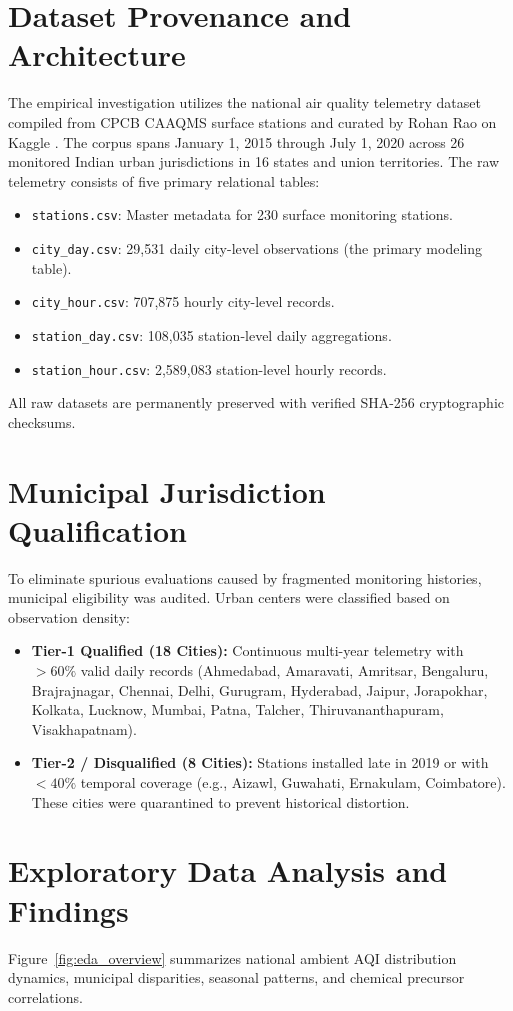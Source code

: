 \documentclass[11pt,a4paper]{report}
\begin{document}
\section{Dataset Provenance and Architecture}
The empirical investigation utilizes the national air quality telemetry dataset compiled from CPCB CAAQMS surface stations and curated by Rohan Rao on Kaggle \cite{rao2020airquality}. The corpus spans January 1, 2015 through July 1, 2020 across 26 monitored Indian urban jurisdictions in 16 states and union territories. The raw telemetry consists of five primary relational tables:
\begin{itemize}
    \item \texttt{stations.csv}: Master metadata for 230 surface monitoring stations.
    \item \texttt{city\_day.csv}: 29,531 daily city-level observations (the primary modeling table).
    \item \texttt{city\_hour.csv}: 707,875 hourly city-level records.
    \item \texttt{station\_day.csv}: 108,035 station-level daily aggregations.
    \item \texttt{station\_hour.csv}: 2,589,083 station-level hourly records.
\end{itemize}
All raw datasets are permanently preserved with verified SHA-256 cryptographic checksums.

\section{Municipal Jurisdiction Qualification}
To eliminate spurious evaluations caused by fragmented monitoring histories, municipal eligibility was audited. Urban centers were classified based on observation density:
\begin{itemize}
    \item \textbf{Tier-1 Qualified (18 Cities):} Continuous multi-year telemetry with $>60\%$ valid daily records (Ahmedabad, Amaravati, Amritsar, Bengaluru, Brajrajnagar, Chennai, Delhi, Gurugram, Hyderabad, Jaipur, Jorapokhar, Kolkata, Lucknow, Mumbai, Patna, Talcher, Thiruvananthapuram, Visakhapatnam).
    \item \textbf{Tier-2 / Disqualified (8 Cities):} Stations installed late in 2019 or with $<40\%$ temporal coverage (e.g., Aizawl, Guwahati, Ernakulam, Coimbatore). These cities were quarantined to prevent historical distortion.
\end{itemize}

\section{Exploratory Data Analysis and Findings}
Figure~\ref{fig:eda_overview} summarizes national ambient AQI distribution dynamics, municipal disparities, seasonal patterns, and chemical precursor correlations.
\end{document}
